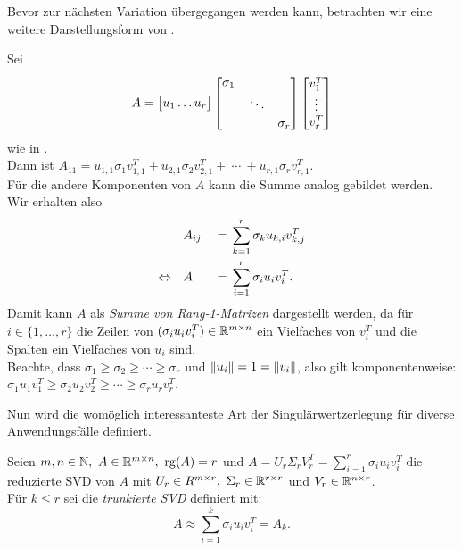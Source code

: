 Bevor zur nächsten Variation übergegangen werden kann, betrachten wir eine weitere Darstellungsform von .
\begin{remark}\label{rem:onesvd}
    Sei
    \begin{equation*}
        A = 
        \big[
            \begin{matrix}
                u_1 \dots u_{r}
            \end{matrix}
        \big]
        \begin{bmatrix}
            \sigma_1 &  & \\
            &  \rotatebox{12}{\(\ddots\)} &  \\
            &  &  \sigma_r \\
        \end{bmatrix}
        \begin{bmatrix}
            v^{T}_1 \\
            \vdots \\
            v^{T}_r \\
        \end{bmatrix}
    \end{equation*}
    wie in . \\
    Dann ist \(A_{11} = u_{1,1} \sigma_1 v^{T}_{1,1} + u_{2,1} \sigma_2 v^{T}_{2,1} +\ \cdots \ + u_{r,1} \sigma_r v^{T}_{r,1} \). \\
    Für die andere Komponenten von \(A\) kann die Summe analog gebildet werden. 
    Wir erhalten also
    \begin{alignat*}{2}
        &A_{ij} &{}={}& \sum_{k=1}^{r} \sigma_k u_{k,i} v^{T}_{k,j}  \\
        \Leftrightarrow \quad &A &{}={}& \sum_{i=1}^{r} \sigma_i u_i v^{T}_i.
    \end{alignat*}
    Damit kann \(A\) als \textit{Summe von Rang-\num{1}-Matrizen} dargestellt werden, da für \(i \in \{1,\ldots,r\}\) die Zeilen von \((\sigma_i u_i v^{T}_i)\in \mathbb{R}^{m \times n}\) ein Vielfaches von \(v^{T}_i\) und die Spalten ein Vielfaches von \(u_i\) sind. \\
    Beachte, dass \(\sigma_1 \geq \sigma_2 \geq \cdots \geq \sigma_r\) und \(\lVert u_i\rVert=1=\lVert v_i\rVert\), also gilt komponentenweise: \(\sigma_1 u_1 v^{T}_1 \geq \sigma_2 u_2 v^{T}_2 \geq \cdots \geq \sigma_r u_r v^{T}_r\). 
\end{remark}
Nun wird die womöglich interessanteste Art der Singulärwertzerlegung für diverse Anwendungsfälle definiert.
\begin{definition}\label{df:trunsvd}
    Seien \(m,n \in \N,\ A \in \R^{m \times n},\ \rg(A)=r\) und \(A=U_r \Sigma_r V^{T}_r = \sum_{i=1}^{r} \sigma_i u_i v^{T}_i\) die reduzierte SVD von \(A\) mit \(U_r \in R^{m \times r},\ \Sigma_r \in \mathbb{R}^{r \times r}\) und \(V_r \in \mathbb{R}^{n \times r}\). \\
    Für \(k \leq r\) sei die \textit{trunkierte SVD} definiert mit:
    \begin{equation*}
        A \approx \sum_{i=1}^{k} \sigma_i u_i v^{T}_i = A_k.
    \end{equation*}
\end{definition}
